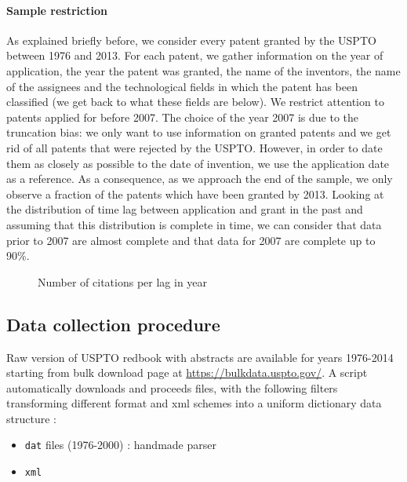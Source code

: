 \documentclass[10pt,A4]{article}
\begin{document}
\paragraph{Sample restriction}
As explained briefly before, we consider every patent granted by the USPTO between 1976 and 2013. For each patent, we gather information on the year of application, the year the patent was granted, the name of the inventors, the name of the assignees and the technological fields in which the patent has been classified (we get back to what these fields are below). We restrict attention to patents applied for before 2007. The choice of the year 2007 is due to the truncation bias: we only want to use information on granted patents and we get rid of all patents that were rejected by the USPTO. However, in order to date them as closely as possible to the date of invention, we use the application date as a reference. As a consequence, as we approach the end of the sample, we only observe a fraction of the patents which have been granted by 2013. Looking at the distribution of time lag between application and grant in the past and assuming that this distribution is complete in time, we can consider that data prior to 2007 are almost complete and that data for 2007 are complete up to 90\%.

\begin{figure}
\centering
{}
 \caption{Number of citations per lag in year}
 \label{fig1}
\end{figure}


\subsection*{Data collection procedure}

\label{supp:data}

Raw version of USPTO redbook with abstracts are available for years 1976-2014 starting from bulk download page at \url{https://bulkdata.uspto.gov/}. A script automatically downloads and proceeds files, with the following filters transforming different format and xml schemes into a uniform dictionary data structure :

\begin{itemize}
\item \texttt{dat} files (1976-2000) : handmade parser
\item \texttt{xml}
\end{itemize}
\end{document}
